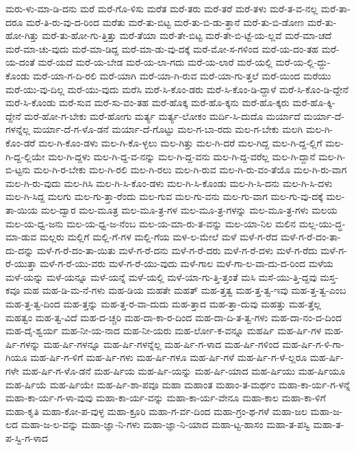 {ಮರು-ಳು-ಮಾ-ಡಿ-ದನು
ಮರೆ
ಮರೆ-ಗೊ-ಳಿಸು
ಮರೆತ
ಮರೆ-ತರು
ಮರೆ-ತರೆ
ಮರೆ-ತಳು
ಮರೆ-ತ-ವ-ನಲ್ಲ
ಮರೆ-ತಾ-ದರೂ
ಮರೆ-ತಿ-ರು-ವು-ದ-ರಿಂದ
ಮರೆತು
ಮರೆ-ತು-ಬಿಟ್ಟ
ಮರೆ-ತು-ಬಿ-ಡು-ತ್ತಾನೆ
ಮರೆ-ತು-ಬಿ-ಡೋಣ
ಮರೆ-ತು-ಹೋ-ಗಿತ್ತು
ಮರೆ-ತು-ಹೋ-ಗು-ತ್ತಿತ್ತು
ಮರೆ-ತೆಯಾ
ಮರೆ-ತೇ-ಬಿಟ್ಟ
ಮರೆ-ತೇ-ಬಿ-ಟ್ಟೆ-ಯ-ಲ್ಲವೆ
ಮರೆ-ಮಾ-ಚದೆ
ಮರೆ-ಮಾ-ಚು-ವುದು
ಮರೆ-ಮಾ-ಡಿದ್ದ
ಮರೆ-ಮಾ-ಡು-ವು-ದಕ್ಕೆ
ಮರೆ-ಮೋ-ಸ-ಗಳಿಂದ
ಮರೆ-ಯ-ದಂ-ತಹ
ಮರೆ-ಯ-ದಂತೆ
ಮರೆ-ಯದೆ
ಮರೆ-ಯ-ಬೇಡ
ಮರೆ-ಯ-ಲಾ-ಗದು
ಮರೆ-ಯ-ಲಾರೆ
ಮರೆ-ಯಲ್ಲಿ
ಮರೆ-ಯ-ಲ್ಲಿ-ದ್ದು-ಕೊಂಡು
ಮರೆ-ಯಾ-ಗ-ದಿ-ರಲಿ
ಮರೆ-ಯಾಗಿ
ಮರೆ-ಯಾ-ಗಿ-ರುವ
ಮರೆ-ಯಾ-ಗು-ತ್ತಲೆ
ಮರೆ-ಯಿಂದ
ಮರೆಯು
ಮರೆ-ಯು-ವು-ದಿಲ್ಲ
ಮರೆ-ಯು-ವುದು
ಮರೆಸಿ
ಮರೆ-ಸಿ-ಕೊಂ-ಡರು
ಮರೆ-ಸಿ-ಕೊಂ-ಡಿ-ದ್ದಾಳೆ
ಮರೆ-ಸಿ-ಕೊಂ-ಡಿ-ದ್ದೇನೆ
ಮರೆ-ಸಿ-ಕೊಂಡು
ಮರೆ-ಸುವ
ಮರೆ-ಸು-ವಂ-ತಹ
ಮರೆ-ಹೊಕ್ಕ
ಮರೆ-ಹೊ-ಕ್ಕನು
ಮರೆ-ಹೊ-ಕ್ಕರು
ಮರೆ-ಹೊ-ಕ್ಕಿ-ದ್ದೇನೆ
ಮರೆ-ಹೋ-ಗ-ಬೇಕು
ಮರೆ-ಹೋಗು
ಮರ್ತ್ಯ
ಮರ್ತ್ಯ-ಲೋಕಂ
ಮರ್ದಿ-ಸಿ-ದುದೊ
ಮರ್ಯಾದೆ
ಮರ್ಯಾ-ದೆ-ಗಳನ್ನೆಲ್ಲ
ಮರ್ಯಾ-ದೆ-ಗ-ಳೊ-ಡನೆ
ಮರ್ಯಾ-ದೆ-ಗೊಟ್ಟು
ಮಲ-ಗ-ಬಾ-ರದು
ಮಲ-ಗ-ಬೇಕು
ಮಲಗಿ
ಮಲ-ಗಿ-ಕೊಂ-ಡರೆ
ಮಲ-ಗಿ-ಕೊಂ-ಡಳು
ಮಲ-ಗಿ-ಕೊ-ಳ್ಳಲು
ಮಲ-ಗಿತ್ತು
ಮಲ-ಗಿ-ದರೆ
ಮಲ-ಗಿದ್ದ
ಮಲ-ಗಿ-ದ್ದ-ಲ್ಲಿಗೆ
ಮಲ-ಗಿ-ದ್ದ-ಲ್ಲಿಯೇ
ಮಲ-ಗಿ-ದ್ದಳು
ಮಲ-ಗಿ-ದ್ದ-ವ-ನನ್ನು
ಮಲ-ಗಿ-ದ್ದ-ವನು
ಮಲ-ಗಿ-ದ್ದ-ವರೆಲ್ಲ
ಮಲ-ಗಿ-ದ್ದಾನೆ
ಮಲ-ಗಿ-ಬಿ-ಟ್ಟನು
ಮಲ-ಗಿ-ರ-ಬೇಕು
ಮಲ-ಗಿ-ರಲಿ
ಮಲ-ಗಿ-ರಲು
ಮಲ-ಗಿ-ರುವ
ಮಲ-ಗಿ-ರು-ವಂ-ತೆಯೊ
ಮಲ-ಗಿ-ರು-ವಾಗ
ಮಲ-ಗಿ-ರು-ವುದು
ಮಲ-ಗಿಸಿ
ಮಲ-ಗಿ-ಸಿ-ಕೊಂ-ಡಳು
ಮಲ-ಗಿ-ಸಿ-ಕೊಂಡು
ಮಲ-ಗಿ-ಸಿ-ದನು
ಮಲ-ಗಿ-ಸಿ-ದಳು
ಮಲ-ಗಿ-ಸಿದ್ದ
ಮಲಗು
ಮಲ-ಗು-ತ್ತಾ-ರೆಂದು
ಮಲ-ಗುವ
ಮಲ-ಗು-ವನು
ಮಲ-ಗು-ವಾಗ
ಮಲ-ಗು-ವು-ದಕ್ಕೆ
ಮಲ-ತಾ-ಯಿಯ
ಮಲ-ದ್ವಾರ
ಮಲ-ಮೂತ್ರ
ಮಲ-ಮೂ-ತ್ರ-ಗಳ
ಮಲ-ಮೂ-ತ್ರ-ಗಳನ್ನು
ಮಲ-ಮೂ-ತ್ರ-ಗಳು
ಮಲಯ
ಮಲ-ಯ-ಧ್ವ-ಜನು
ಮಲ-ಯ-ಧ್ವ-ಜ-ನೆಂಬ
ಮಲ-ಯ-ಮಾ-ರು-ತ-ವನ್ನು
ಮಲ-ಯಾ-ನಿಲ
ಮಲಿನ
ಮಲ್ಲ-ಯು-ದ್ಧ-ಮಾ-ಡುವ
ಮಲ್ಲರು
ಮಲ್ಲಿಗೆ
ಮಲ್ಲಿ-ಗೆ-ಗಳ
ಮಲ್ಲಿ-ಗೆಯ
ಮಳ-ಲ-ಮೇಲೆ
ಮಳೆ
ಮಳೆ-ಗ-ರೆದ
ಮಳೆ-ಗ-ರೆ-ದಂ-ತಾ-ದು-ದನ್ನು
ಮಳೆ-ಗ-ರೆ-ದಂ-ತಾ-ಯಿತು
ಮಳೆ-ಗ-ರೆ-ದನು
ಮಳೆ-ಗ-ರೆ-ದರು
ಮಳೆ-ಗ-ರೆ-ದಳು
ಮಳೆ-ಗ-ರೆದು
ಮಳೆ-ಗ-ರೆ-ಯುತ್ತಾ
ಮಳೆ-ಗ-ರೆ-ಯು-ವರು
ಮಳೆ-ಗ-ರೆ-ಯು-ವುದು
ಮಳೆ-ಗಾಲ
ಮಳೆ-ಗಾ-ಲ-ವಾ-ದು-ದ-ರಿಂದ
ಮಳೆಯ
ಮಳೆ-ಯನ್ನು
ಮಳೆ-ಯನ್ನೂ
ಮಳೆ-ಯನ್ನೆ
ಮಳೆ-ಯಲ್ಲಿ
ಮಳೆ-ಯಾ-ಗು-ತ್ತಿ-ತ್ತಂತೆ
ಮಸಿ
ಮಸೆ-ಯು-ತ್ತಿ-ದ್ದವು
ಮಸ್ತ-ಕವೂ
ಮಹ
ಮಹ-ಡಿ-ಮ-ನೆ-ಗಳು
ಮಹ-ಡಿಯ
ಮಹತೇ
ಮಹತ್
ಮಹ-ತ್ತತ್ವ
ಮಹ-ತ್ತ-ತ್ವ-ಇವು
ಮಹ-ತ್ತ-ತ್ವ-ಎಂಬ
ಮಹ-ತ್ತ-ತ್ವ-ದಿಂದ
ಮಹ-ತ್ತನ್ನು
ಮಹ-ತ್ತ-ರ-ವಾ-ದುದು
ಮಹ-ತ್ತಾದ
ಮಹ-ತ್ತಾ-ದುವು
ಮಹತ್ತು
ಮಹ-ತ್ತೆಲ್ಲ
ಮಹತ್ವಂ
ಮಹ-ತ್ವ-ವಿದೆ
ಮಹ-ದ-ಚ್ಚರಿ
ಮಹ-ದಾ-ಕಾ-ರ-ದಿಂದ
ಮಹ-ದಾ-ದಿ-ತ-ತ್ವ-ಗಳು
ಮಹ-ದಾ-ನಂ-ದ-ದಿಂದ
ಮಹ-ದೈ-ಶ್ವರ್ಯ
ಮಹ-ನೀ-ಯ-ನಾದ
ಮಹ-ನೀ-ಯರು
ಮಹ-ರ್ಲೋ-ಕ-ವನ್ನೂ
ಮಹರ್ಷಿ
ಮಹ-ರ್ಷಿ-ಗಳ
ಮಹ-ರ್ಷಿ-ಗಳನ್ನು
ಮಹ-ರ್ಷಿ-ಗಳನ್ನೂ
ಮಹ-ರ್ಷಿ-ಗಳನ್ನೆಲ್ಲ
ಮಹ-ರ್ಷಿ-ಗ-ಳಾದ
ಮಹ-ರ್ಷಿ-ಗಳಿಂದ
ಮಹ-ರ್ಷಿ-ಗ-ಳಿ-ಗಾ-ಗಿಯೂ
ಮಹ-ರ್ಷಿ-ಗ-ಳಿಗೆ
ಮಹ-ರ್ಷಿ-ಗಳು
ಮಹ-ರ್ಷಿ-ಗಳೂ
ಮಹ-ರ್ಷಿ-ಗಳೆ
ಮಹ-ರ್ಷಿ-ಗ-ಳೆ-ಲ್ಲರೂ
ಮಹ-ರ್ಷಿ-ಗಳೇ
ಮಹ-ರ್ಷಿ-ಗ-ಳೊ-ಡನೆ
ಮಹ-ರ್ಷಿಯ
ಮಹ-ರ್ಷಿ-ಯನ್ನು
ಮಹ-ರ್ಷಿ-ಯಾದ
ಮಹ-ರ್ಷಿಯು
ಮಹ-ರ್ಷಿಯೂ
ಮಹ-ರ್ಷಿಯೆ
ಮಹ-ರ್ಷಿಯೇ
ಮಹ-ರ್ಷಿ-ಶಾ-ಪವೂ
ಮಹಾ
ಮಹಾಂತ
ಮಹಾಂ-ತ-ಮರ್ಥಂ
ಮಹಾ-ಕಾ-ರ್ಯ-ಗ-ಳನ್ನೆ
ಮಹಾ-ಕಾ-ರ್ಯ-ಗ-ಳಾ-ವುವು
ಮಹಾ-ಕಾ-ರ್ಯ-ವನ್ನು
ಮಹಾ-ಕಾ-ರ್ಯ-ವೇನೂ
ಮಹಾ-ಕಾಲ
ಮಹಾ-ಕಾ-ಳಿಗೆ
ಮಹಾ-ಕೃತಿ
ಮಹಾ-ಕೋ-ಪ-ವುಳ್ಳ
ಮಹಾ-ಕ್ರೂರಿ
ಮಹಾ-ಗ-ರ್ವ-ದಿಂದ
ಮಹಾ-ಗ್ರಂ-ಥ-ಗಳೆ
ಮಹಾ-ಜಲ
ಮಹಾ-ಜ-ಲದ
ಮಹಾ-ಜ-ಲ-ವನ್ನು
ಮಹಾ-ಜ್ಞಾ-ನಿ-ಗಳು
ಮಹಾ-ಜ್ಞಾ-ನಿ-ಯಾದ
ಮಹಾ-ಟ್ಟ-ಹಾಸಂ
ಮಹಾ-ತ-ಪಸ್ವಿ
ಮಹಾ-ತ-ಪ-ಸ್ವಿ-ಗ-ಳಾದ
}
